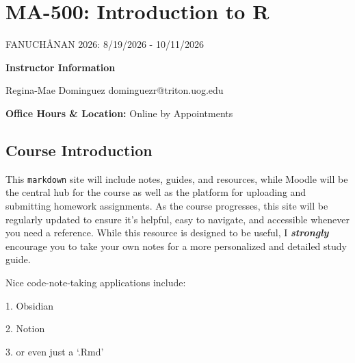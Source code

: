 \documentclass[
  letterpaper,
  DIV=11,
  numbers=noendperiod]{scrreprt}
\author{}
\date{}
\begin{document}
\chapter*{MA-500: Introduction to R}\label{ma-500-introduction-to-r}

FANUCHÅNAN 2026: 8/19/2026 - 10/11/2026

\textbf{Instructor Information}

Regina-Mae Dominguez \textbar{} dominguezr@triton.uog.edu

\textbf{Office Hours \& Location:} Online by Appointments

\section*{Course Introduction}\label{course-introduction}

This \texttt{markdown} site will include notes, guides, and resources,
while Moodle will be the central hub for the course as well as the
platform for uploading and submitting homework assignments. As the
course progresses, this site will be regularly updated to ensure it's
helpful, easy to navigate, and accessible whenever you need a reference.
While this resource is designed to be useful, I \textbf{\emph{strongly}}
encourage you to take your own notes for a more personalized and
detailed study guide.

Nice code-note-taking applications include:

1. Obsidian

2. Notion

3. or even just a `.Rmd'
\end{document}
